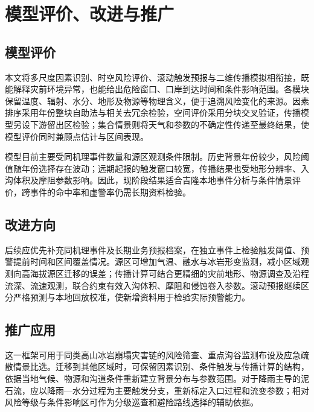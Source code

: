 \section{模型评价、改进与推广}

\subsection{模型评价}
本文将多尺度因素识别、时空风险评价、滚动触发预报与二维传播模拟相衔接，既能解释灾前环境异常，也能给出危险窗口、口岸到达时间和条件影响范围。各模块保留温度、辐射、水分、地形及物源等物理含义，便于追溯风险变化的来源。因素排序采用年份整块自助法与相关去冗余检验，空间评价采用分块交叉验证，传播模型另设下游留出区检验；集合情景则将天气和参数的不确定性传递至最终结果，使模型评价同时兼顾点估计与区间表现。

模型目前主要受同机理事件数量和源区观测条件限制。历史背景年份较少，风险阈值随年份选择存在波动；远期起报的触发窗口较宽，传播结果也受地形分辨率、入沟体积及摩阻参数影响。因此，现阶段结果适合吉隆本地事件分析与条件情景评价，跨事件的命中率和虚警率仍需长期资料检验。

\subsection{改进方向}
后续应优先补充同机理事件及长期业务预报档案，在独立事件上检验触发阈值、预警提前时间和区间覆盖情况。源区可增加气温、融水与冰岩形变监测，减小区域观测向高海拔源区迁移的误差；传播计算可结合更精细的灾前地形、物源调查及沿程流深、流速观测，联合约束有效入沟体积、摩阻和侵蚀卷入参数。滚动预报继续区分严格预测与本地回放校准，使新增资料用于检验实际预警能力。

\subsection{推广应用}
这一框架可用于同类高山冰岩崩塌灾害链的风险筛查、重点沟谷监测布设及应急疏散情景比选。迁移到其他区域时，可保留因素识别、条件触发与传播计算的结构，依据当地气候、物源和沟道条件重新建立背景分布与参数范围。对于降雨主导的泥石流，应以降雨—水分过程为主要触发分支，重新标定入口过程和流变参数；相对风险等级与条件影响区可作为分级巡查和避险路线选择的辅助依据。
